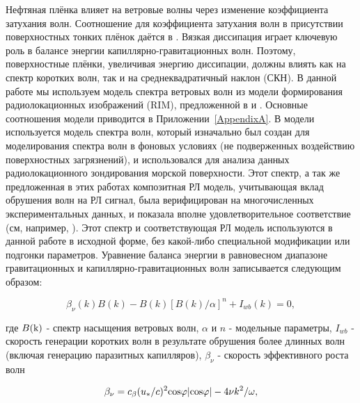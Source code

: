 Нефтяная плёнка влияет на ветровые волны через изменение коэффициента затухания волн. Соотношение для коэффициента затухания волн в присутствии поверхностных тонких плёнок даётся в \citep{Levich1962}. Вязкая диссипация играет ключевую роль в балансе энергии капиллярно-гравитационных волн. Поэтому, поверхностные плёнки, увеличивая энергию диссипации, должны влиять как на спектр коротких волн, так и на среднеквадратичный наклон (СКН). В данной работе мы используем модель спектра ветровых волн из модели формирования радиолокационных изображений (RIM), предложенной в \citep{Kudryavtsev2003, Kudryavtsev2004, Kudryavtsev2005} и \citep{Johannessen2005}. Основные соотношения модели приводится в  Приложении~\ref{AppendixA}. В модели используется модель спектра волн, который изначально был создан для моделирования спектра волн в фоновых условиях (не подверженных воздействию поверхностных загрязнений), и использовался для анализа данных радиолокационного зондирования морской поверхности. Этот спектр, а так же предложенная в этих работах композитная РЛ модель, учитывающая вклад обрушения волн на РЛ сигнал, была верифицирован на многочисленных экспериментальных данных, и показала вполне удовлетворительное соответствие (см, например, \citep{Mouche2006}). Этот спектр и соответствующая РЛ модель используются в данной работе в исходной форме, без какой-либо специальной модификации или подгонки параметров. Уравнение баланса энергии в равновесном диапазоне гравитационных и капиллярно-гравитационных волн записывается следующим образом:


\begin{equation} \label{eq:2.1}
\beta_{\nu }(k) B(k) - B(k) \left[ B(k) / \alpha \right]^n + I_{wb}(k) = 0 ,
\end{equation}


\noindent где $B({\rm k})$ - спектр насыщения ветровых волн, $\alpha $ и $n$ - модельные параметры, $I_{wb}^{} $ - скорость генерации коротких волн в результате обрушения более длинных волн (включая генерацию паразитных капилляров), $\beta_{\nu } $ - скорость эффективного роста волн



\begin{equation} \label{eq:2.2} 
\beta _{\nu } =c_{\beta } (u_{{\rm *}} /c)^{2} {\rm cos}\varphi |{\rm cos}\varphi |-4\nu k^{2} /\omega ,
\end{equation}


